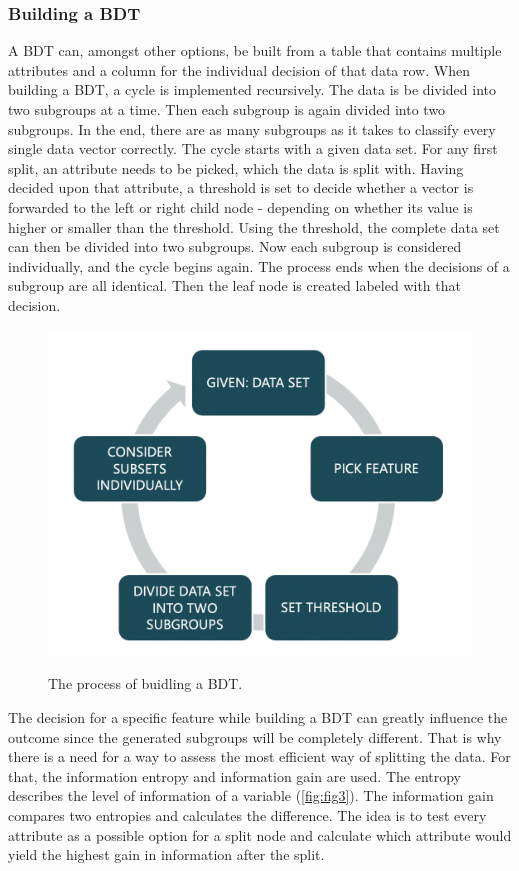 \documentclass[
12pt,
headsepline,
bibliography=totoc,
twoside=semi,
]{scrartcl}
\begin{document}
 \subsubsection{Building a BDT\label{sec:sec2-1-2}}
 A BDT can, amongst other options, be built from a table that contains multiple attributes and a column for the individual decision of that data row. When building a BDT, a cycle is implemented recursively. The data is be divided into two subgroups at a time. Then each subgroup is again divided into two subgroups. In the end, there are as many subgroups as it takes to classify every single data vector correctly. The cycle starts with a given data set. For any first split, an attribute needs to be picked, which the data is split with. Having decided upon that attribute, a threshold is set to decide whether a vector is forwarded to the left or right child node - depending on whether its value is higher or smaller than the threshold. Using the threshold, the complete data set can then be divided into two subgroups. Now each subgroup is considered individually, and the cycle begins again. The process ends when the decisions of a subgroup are all identical. Then the leaf node is created labeled with that decision. 

 \begin{figure}[H]
 \centering \includegraphics[scale=0.3]{BDT2.png}\label{fig:fig2}
 \caption{The process of buidling a BDT.}
 \end{figure}


 The decision for a specific feature while building a BDT can greatly influence the outcome since the generated subgroups will be completely different. That is why there is a need for a way to assess the most efficient way of splitting the data. For that, the information entropy and information gain are used. The entropy describes the level of information of a variable (\ref{fig:fig3}). The information gain compares two entropies and calculates the difference. The idea is to test every attribute as a possible option for a split node and calculate which attribute would yield the highest gain in information after the split. 
\end{document}
